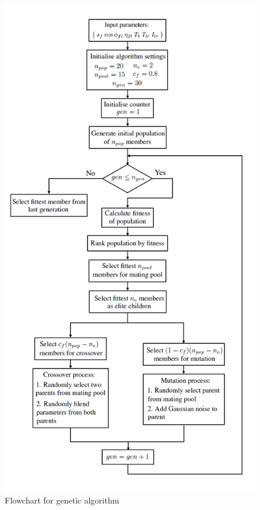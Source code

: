 \documentclass{article}
\begin{document}
\begin{figure}
\begin{center}
\includegraphics[scale=0.54]{./Figures/GA_Algorithm.png}
\caption{Flowchart for genetic algorithm}
\label{fig:ga_algorithm}
\end{center}
\end{figure}
\end{document}
